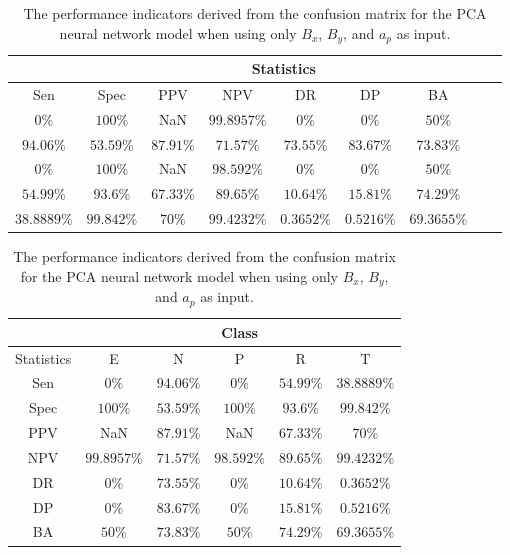 \begin{table}[!ht]
	\centering
	\begin{tabular}{|c|c|c|c|c|c|c|c|c|}
		\hline
		 & \multicolumn{7}{c|}{Statistics} \\ \hline
		Sen & Spec & PPV & NPV & DR & DP & BA \\ \hline
		$0\%$ & $100\%$ & NaN & $99.8957\%$ & $0\%$ & $0\%$ & $50\%$ \\ \hline
		$94.06\%$ & $53.59\%$ & $87.91\%$ & $71.57\%$ & $73.55\%$ & $83.67\%$ & $73.83\%$ \\ \hline
		$0\%$ & $100\%$ & NaN & $98.592\%$ & $0\%$ & $0\%$ & $50\%$ \\ \hline
		$54.99\%$ & $93.6\%$ & $67.33\%$ & $89.65\%$ & $10.64\%$ & $15.81\%$ & $74.29\%$ \\ \hline
		$38.8889\%$ & $99.842\%$ & $70\%$ & $99.4232\%$ & $0.3652\%$ & $0.5216\%$ & $69.3655\%$ \\ \hline
	\end{tabular}
	\caption{The performance indicators derived from the confusion matrix for the PCA neural network model when using only $B_{x}$, $B_{y}$, and $a_{p}$ as input.}
	\label{tab:cs:xyap:pcaNNet}
\end{table}

\begin{table}[!ht]
	\centering
	\begin{tabular}{|c|c|c|c|c|c|}
		\hline
		 & \multicolumn{5}{c|}{Class} \\ \hline
		Statistics & E & N & P & R & T \\ \hline
		Sen & $0\%$ & $94.06\%$ & $0\%$ & $54.99\%$ & $38.8889\%$ \\ \hline
		Spec & $100\%$ & $53.59\%$ & $100\%$ & $93.6\%$ & $99.842\%$ \\ \hline
		PPV & NaN & $87.91\%$ & NaN & $67.33\%$ & $70\%$ \\ \hline
		NPV & $99.8957\%$ & $71.57\%$ & $98.592\%$ & $89.65\%$ & $99.4232\%$ \\ \hline
		DR & $0\%$ & $73.55\%$ & $0\%$ & $10.64\%$ & $0.3652\%$ \\ \hline
		DP & $0\%$ & $83.67\%$ & $0\%$ & $15.81\%$ & $0.5216\%$ \\ \hline
		BA & $50\%$ & $73.83\%$ & $50\%$ & $74.29\%$ & $69.3655\%$ \\ \hline
	\end{tabular}
	\caption{The performance indicators derived from the confusion matrix for the PCA neural network model when using only $B_{x}$, $B_{y}$, and $a_{p}$ as input.}
	\label{tab:cs:reverse:xyap:pcaNNet}
\end{table}
